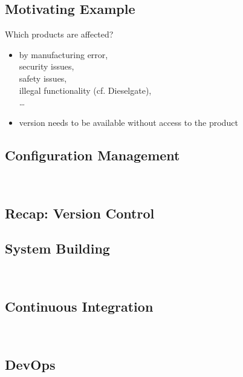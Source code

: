 \subsection{Motivating Example}
\begin{frame}{\insertsubsection}
	\begin{fancycolumns}[widths={66}]
	\nextcolumn
		\begin{example}{Which products are affected?}
			\begin{itemize}
				\item by manufacturing error,\\ security issues,\\ safety issues,\\ illegal functionality (cf. Dieselgate),\\ \ldots{}
				\item version needs to be available without access to the product
			\end{itemize}
		\end{example}
	\end{fancycolumns}
\end{frame}

\subsection{Configuration Management}
\begin{frame}{\insertsubsection\ \mytitlesource{\sommerville}}
	\slideConfigManagement
\end{frame}

\subsection{Recap: Version Control}
\begin{frame}{\insertsubsection}
	\slideVersionControl
\end{frame}

\subsection{System Building}
\begin{frame}{\insertsubsection\ \mytitlesource{\sommerville}}
	\frameSystemBuilding
\end{frame}

\subsection{Continuous Integration}
\begin{frame}{\insertsubsection\ \mytitlesource{\sommerville}}
	\frameContinousIntegration
\end{frame}


\subsection{DevOps}
\begin{frame}{\insertsubsection\ \mytitlesource{\handbuch}}
	\frameDevOps
\end{frame}

\begin{frame}{\insertsubsection}
	\centering{}
\end{frame}

